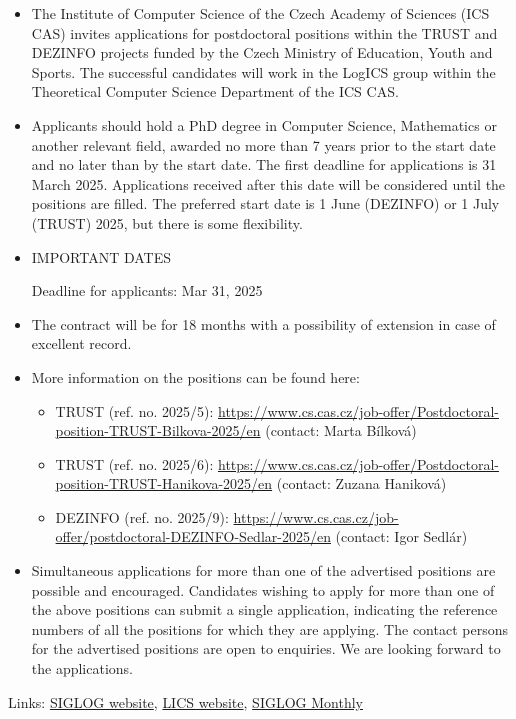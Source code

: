 \documentclass[prodmode,acmtecs]{acmsmall} %
\begin{document}
\begin{itemize}\item  The Institute of Computer Science of the Czech Academy of Sciences (ICS CAS) invites applications for postdoctoral positions within the TRUST and DEZINFO projects funded by the Czech Ministry of Education, Youth and Sports. The successful candidates will work in the LogICS group within the Theoretical Computer Science Department of the ICS CAS.  
 
\item  Applicants should hold a PhD degree in Computer Science, Mathematics or another relevant field, awarded no more than 7 years prior to the start date and no later than by the start date. The first deadline for applications is 31 March 2025. Applications received after this date will be considered until the positions are filled. The preferred start date is 1 June (DEZINFO) or 1 July (TRUST) 2025, but there is some flexibility. 
 
\item IMPORTANT DATES 
 
Deadline for applicants: Mar 31, 2025 
 
\item  The contract will be for 18 months with a possibility of extension in case of excellent record. 
 
\item  More information on the positions can be found here: 
 
\begin{itemize}\item  TRUST (ref. no. 2025/5): \href{https://www.cs.cas.cz/job-offer/Postdoctoral-position-TRUST-Bilkova-2025/en}{https://www.cs.cas.cz/job-offer/Postdoctoral-position-TRUST-Bilkova-2025/en} (contact: Marta Bílková)
\item  TRUST (ref. no. 2025/6): \href{https://www.cs.cas.cz/job-offer/Postdoctoral-position-TRUST-Hanikova-2025/en}{https://www.cs.cas.cz/job-offer/Postdoctoral-position-TRUST-Hanikova-2025/en} (contact: Zuzana Haniková)
\item  DEZINFO (ref. no. 2025/9): \href{https://www.cs.cas.cz/job-offer/postdoctoral-DEZINFO-Sedlar-2025/en}{https://www.cs.cas.cz/job-offer/postdoctoral-DEZINFO-Sedlar-2025/en} (contact: Igor Sedlár)
\end{itemize} 
\item  Simultaneous applications for more than one of the advertised positions are possible and encouraged. Candidates wishing to apply for more than one of the above positions can submit a single application, indicating the reference numbers of all the positions for which they are applying. The contact persons for the advertised positions are open to enquiries. We are looking forward to the applications. 
 
\end{itemize}


\bigskip Links: \href{http://siglog.org/}{SIGLOG website}, \href{https://lics.siglog.org}{LICS website}, \href{https://lics.siglog.org/newsletters/}{SIGLOG Monthly}
\end{document}
